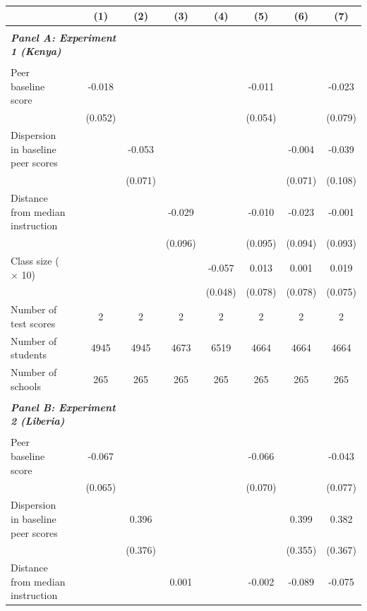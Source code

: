 \begin{center} 
\caption{\small Effect on test scores} 
\label{tab:descriptives} 
\begin{scriptsize}
\begin{threeparttable}
\begin{tabular} {@{} l l c c c c c c c  @{}} \toprule \toprule
& &(1)&(2)&(3)&(4)&(5)&(6)&(7) \\ \midrule 
\\
\multicolumn{3}{l}{\textbf{\textit{Panel A: Experiment 1 (Kenya)}}} \\
\\
Peer baseline score &  & -0.018 &  &  &  & -0.011 &  & -0.023 \\
                 &  & (0.052) &  &  &  & (0.054) &  & (0.079) \\
Dispersion in baseline peer scores &  &  & -0.053 &  &  &  & -0.004 & -0.039 \\
                 &  &  & (0.071) &  &  &  & (0.071) & (0.108) \\
Distance from median instruction &  &  &  & -0.029 &  & -0.010 & -0.023 & -0.001 \\
                 &  &  &  & (0.096) &  & (0.095) & (0.094) & (0.093) \\
Class size ($\times$ 10) &  &  &  &  & -0.057 & 0.013 & 0.001 & 0.019 \\
                 &  &  &  &  & (0.048) & (0.078) & (0.078) & (0.075) \\
\midrule
Number of test scores &  & 2 & 2 & 2 & 2 & 2 & 2 & 2 \\
Number of students &  & 4945 & 4945 & 4673 & 6519 & 4664 & 4664 & 4664 \\
Number of schools &  & 265 & 265 & 265 & 265 & 265 & 265 & 265 \\
 \midrule
\\
\multicolumn{3}{l}{\textbf{\textit{Panel B: Experiment 2 (Liberia)}}} \\
\\
Peer baseline score &  & -0.067 &  &  &  & -0.066 &  & -0.043 \\
                 &  & (0.065) &  &  &  & (0.070) &  & (0.077) \\
Dispersion in baseline peer scores &  &  & 0.396 &  &  &  & 0.399 & 0.382 \\
                 &  &  & (0.376) &  &  &  & (0.355) & (0.367) \\
Distance from median instruction &  &  &  & 0.001 &  & -0.002 & -0.089 & -0.075 \\

\end{tabular}
\end{threeparttable}
\end{scriptsize}
\end{center}

